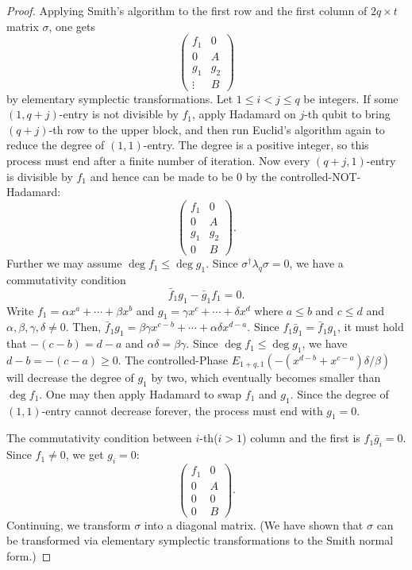 \documentclass[letterpaper,12pt]{amsart}
\theoremstyle{definition} \newtheorem{defn}{Definition}
\theoremstyle{definition} \newtheorem{rem}{Remark}
\theoremstyle{definition} \newtheorem{example}{Example}
\begin{document}
\begin{proof}
Applying Smith's algorithm to the first row and the first column of $2q \times t$ matrix $\sigma$,
one gets
\[
\begin{pmatrix}
  f_1 & 0 \\
  0   & A \\
  \hline
  g_1 & g_2 \\
  \vdots   & B  
\end{pmatrix}
\]
by elementary symplectic transformations.
Let $1 \le i < j \le q$ be integers.
If some $(1,q+j)$-entry is not divisible by $f_1$,
apply Hadamard on $j$-th qubit to bring $(q+j)$-th row to the upper block,
and then run Euclid's algorithm again to reduce the degree of $(1,1)$-entry.
The degree is a positive integer, so this process must end after a finite number of iteration.
Now every $(q+j,1)$-entry is divisible by $f_1$ and hence can be made to be $0$
by the controlled-NOT-Hadamard:
\[
\begin{pmatrix}
  f_1 & 0 \\
  0   & A \\
  \hline
  g_1 & g_2 \\
  0   & B  
\end{pmatrix} .
\]
Further we may assume $\deg f_1 \le \deg g_1$.
Since $\sigma^\dagger \lambda_q \sigma = 0$,
we have a commutativity condition
\[
 \bar f_1 g_1 - \bar g_1 f_1 = 0 .
\]
Write $f_1 = \alpha x^a + \cdots + \beta x^b $
and $ g_1 = \gamma x^c + \cdots + \delta x^d $
where $ a \le b$ and $c \le d$ and $\alpha,\beta,\gamma,\delta \neq 0$.
Then, $\bar f_1 g_1 = \beta \gamma x^{c-b} + \cdots + \alpha \delta x^{d-a}$.
Since $f_1 \bar g_1 = \bar f_1 g_1$, it must hold that $-(c-b)=d-a$
and $\alpha \delta = \beta \gamma$.
Since $\deg f_1 \le \deg g_1$, we have $d-b = -(c-a) \ge 0$.
The controlled-Phase $E_{1+q,1}( -(x^{d-b} + x^{c-a})\delta / \beta )$
will decrease the degree of $g_1$ by two,
which eventually becomes smaller than $\deg f_1$.
One may then apply Hadamard to swap $f_1$ and $g_1$.
Since the degree of $(1,1)$-entry cannot decrease forever,
the process must end with $g_1 = 0$.

The commutativity condition between $i$-th($i>1$) column and the first
is $ f_1 \bar g_i = 0 $. Since $f_1 \ne 0$, we get $g_i = 0$:
\[
\begin{pmatrix}
  f_1 & 0 \\
  0   & A \\
  \hline
  0 & 0 \\
  0 & B  
\end{pmatrix} .
\]
Continuing, we transform $\sigma$ into a diagonal matrix.
(We have shown that $\sigma$ can be transformed 
via elementary symplectic transformations to the Smith normal form.)


\end{proof}
\end{document}
